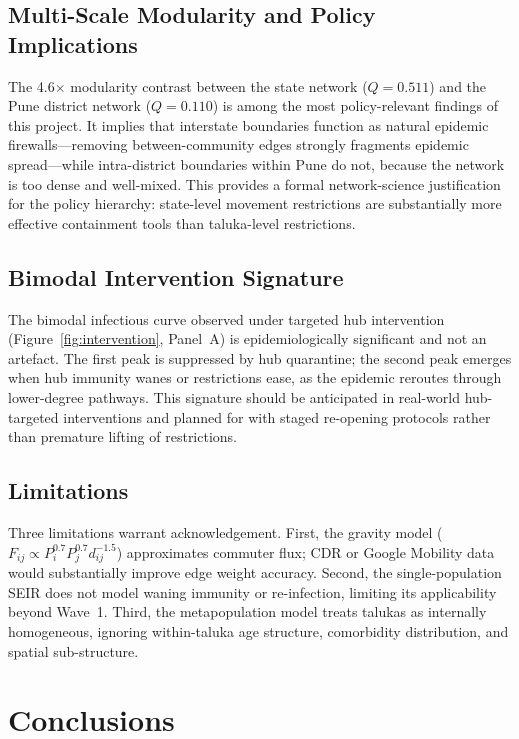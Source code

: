 \documentclass[sigconf,authordraft]{acmart}
\begin{document}
\subsection{Multi-Scale Modularity and Policy Implications}

The 4.6$\times$ modularity contrast between the state network
($Q = 0.511$) and the Pune district network ($Q = 0.110$) is among
the most policy-relevant findings of this project. It implies that
interstate boundaries function as natural epidemic firewalls---removing
between-community edges strongly fragments epidemic spread---while
intra-district boundaries within Pune do not, because the network is
too dense and well-mixed. This provides a formal network-science
justification for the policy hierarchy: state-level movement restrictions
are substantially more effective containment tools than taluka-level
restrictions.

\subsection{Bimodal Intervention Signature}

The bimodal infectious curve observed under targeted hub intervention
(Figure~\ref{fig:intervention}, Panel~A) is epidemiologically significant
and not an artefact. The first peak is suppressed by hub quarantine; the
second peak emerges when hub immunity wanes or restrictions ease, as the
epidemic reroutes through lower-degree pathways. This signature should
be anticipated in real-world hub-targeted interventions and planned for
with staged re-opening protocols rather than premature lifting of
restrictions.

\subsection{Limitations}

Three limitations warrant acknowledgement.
First, the gravity model ($F_{ij} \propto P_i^{0.7} P_j^{0.7} d_{ij}^{-1.5}$)
approximates commuter flux; CDR or Google Mobility data would substantially
improve edge weight accuracy. Second, the single-population SEIR does not
model waning immunity or re-infection, limiting its applicability beyond
Wave~1. Third, the metapopulation model treats talukas as internally
homogeneous, ignoring within-taluka age structure, comorbidity distribution,
and spatial sub-structure.

\section{Conclusions}
\label{sec:conclusion}
\end{document}
